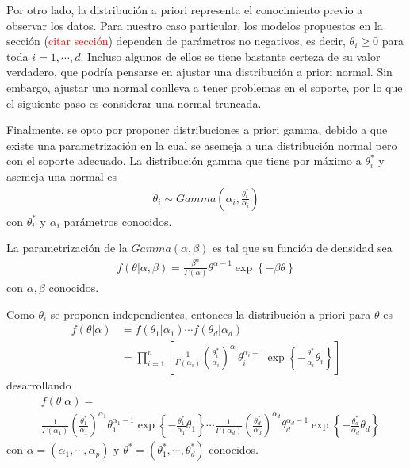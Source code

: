 Por otro lado, la distribución a priori representa el conocimiento previo a observar los datos. Para nuestro caso particular, los modelos propuestos en la sección (\textcolor{red}{citar sección}) dependen de parámetros no negativos, es decir, $\theta_i \geq 0$ para toda $i = 1,\cdots, d$. Incluso algunos de ellos se tiene bastante certeza de su valor verdadero, que podría pensarse en ajustar una distribución a priori normal. Sin embargo, ajustar una normal conlleva a tener problemas en el soporte, por lo que el siguiente paso es considerar una normal truncada. 

Finalmente, se opto por proponer distribuciones a priori gamma, debido a que existe una parametrización en la cual se asemeja a una distribución normal pero con el soporte adecuado. La distribución gamma que tiene por  máximo a $\theta_{i}^{*}$ y asemeja una normal es 
\begin{align}
    \theta_i \sim Gamma\left(\alpha_i, \frac{\theta_i^{*}}{\alpha_i} \right) 
    \label{3.2.1.03}
\end{align}
con $\theta_i^{*}$ y $\alpha_i$ parámetros conocidos.

La parametrización de la $Gamma(\alpha,\beta)$ es tal que su función de densidad sea
\begin{align*}
    f(\theta|\alpha,\beta) = \frac{\beta^\alpha}{\Gamma(\alpha)} \theta^{\alpha-1} \exp \left \{ -\beta \theta\right \} 
\end{align*}
con $\alpha,\beta$ conocidos.

Como $\theta_i$ se proponen independientes, entonces la distribución a priori para $\theta$ es
\begin{align}
    f(\theta|\alpha) &= f(\theta_1|\alpha_1) \cdots f(\theta_d|\alpha_d) \nonumber \\
    &= \prod_{i = 1}^{n} \left[\frac{1}{\Gamma(\alpha_i)}\left(\frac{\theta_i^{*}}{\alpha_i}\right) ^{\alpha_i} \theta_i^{\alpha_i -1} \exp \left \{ -\frac{\theta_i^{*}}{\alpha_i}\theta_i\right \}\right] 
    \label{3.2.1.04}
\end{align}
desarrollando
\begin{align}
    &f(\theta|\alpha) =  \nonumber \\
    &\frac{1}{\Gamma(\alpha_1)}\left(\frac{\theta_1^{*}}{\alpha_1}\right) ^{\alpha_1} \theta_1^{\alpha_1 -1} \exp \left \{ -\frac{\theta_1^{*}}{\alpha_1}\theta_1\right \}  \cdots \frac{1}{\Gamma(\alpha_d)}\left(\frac{\theta_d^{*}}{\alpha_d}\right) ^{\alpha_d} \theta_d^{\alpha_d -1} \exp \left \{ -\frac{\theta_d^{*}}{\alpha_d}\theta_d\right \}
    \label{3.2.1.05}
\end{align}
con $\alpha = (\alpha_1,\cdots, \alpha_p)$ y $\theta^{*} = (\theta_1^{*}, \cdots , \theta_d^{*})$ conocidos.


